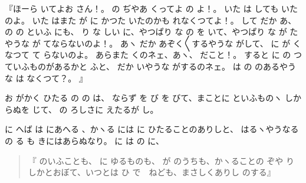 『ほーら
いてよお
さん！。
の
ぢやあ
くってよ
の
よ！。
いた
は
しても
いたのよ。
いた
はまた
が
に
かつた
いたのかも
れなくつてよ！。
して
だか
あ、
の
の
といふ
にも、
り
な
しい
に、やつぱり
な
の
を
いて、やつぱり
な
が
たやうな
が
てならないのよ！。
あヽ
だか
あぞく〳〵するやうな
がして、
に
が
くなつて
て
らないのよ。
あらまた
くのネェ、あヽ、
だこと！。
すると
に
の
つていふものがあるかと
ふと、
だか
いやうな
がするのネェ。
は
の
のあるやうな
は
なくつて？。
』

お
がかく
ひたる
の
の
は、
ならず
を
び
を
びて、まことに
といふものヽ
しからぬを
じて、
の
ろしさに
えたるが
し。

に
へば
は
にあへる
、かヽる
には
に
ひたることのありしと、
はるヽやうなる
の
る
も
きにはあらぬなり。
に
は
の
に、

\begin{quote}
『
のいふことも、
に
ゆるものも、
が
のうちも、かヽることの
ぞや
りしかとおぼて、いつとは
ひ
で　ねども、まさしくありし
のする』
\end{quote}

